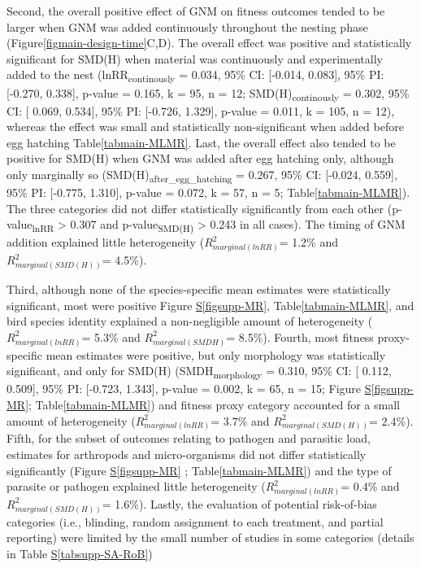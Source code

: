 \documentclass[
  number,
  review,
  onecolumn]{elsarticle}
\newcommand*\quartofigsuppref[1]{Figure \hyperref[#1]{S\ref{#1}}}
\newcommand*\quartotabsuppref[1]{Table \hyperref[#1]{S\ref{#1}}}
\begin{document}
Second, the overall positive effect of GNM on fitness outcomes tended to
be larger when GNM was added continuously throughout the nesting phase
(Figure\ref{figmain-design-time}C,D). The overall effect was positive
and statistically significant for SMD(H) when material was continuously
and experimentally added to the nest (lnRR\textsubscript{continously} =
0.034, 95\% CI: {[}-0.014, 0.083{]}, 95\% PI: {[}-0.270, 0.338{]},
p-value = 0.165, k = 95, n = 12; SMD(H)\textsubscript{continously} =
0.302, 95\% CI: {[} 0.069, 0.534{]}, 95\% PI: {[}-0.726, 1.329{]},
p-value = 0.011, k = 105, n = 12), whereas the effect was small and
statistically non-significant when added before egg hatching
Table\ref{tabmain-MLMR}. Last, the overall effect also tended to be
positive for SMD(H) when GNM was added after egg hatching only, although
only marginally so (SMD(H)\textsubscript{after\_egg\_hatching} = 0.267,
95\% CI: {[}-0.024, 0.559{]}, 95\% PI: {[}-0.775, 1.310{]}, p-value =
0.072, k = 57, n = 5; Table\ref{tabmain-MLMR}). The three categories did
not differ statistically significantly from each other
(p-value\textsubscript{lnRR} \textgreater{} 0.307 and
p-value\textsubscript{SMD(H)} \textgreater{} 0.243 in all cases). The
timing of GNM addition explained little heterogeneity
(\(R^2_{marginal(lnRR)}\)= 1.2\% and \(R^2_{marginal(SMD(H))}\)= 4.5\%).

Third, although none of the species-specific mean estimates were
statistically significant, most were positive
\quartofigsuppref{figsupp-MR}, Table\ref{tabmain-MLMR}, and bird species
identity explained a non-negligible amount of heterogeneity
(\(R^2_{marginal(lnRR)}\)= 5.3\% and \(R^2_{marginal(SMDH)}\)= 8.5\%).
Fourth, most fitness proxy-specific mean estimates were positive, but
only morphology was statistically significant, and only for SMD(H)
(SMDH\textsubscript{morphology} = 0.310, 95\% CI: {[} 0.112, 0.509{]},
95\% PI: {[}-0.723, 1.343{]}, p-value = 0.002, k = 65, n = 15;
\quartofigsuppref{figsupp-MR}; Table\ref{tabmain-MLMR}) and fitness
proxy category accounted for a small amount of heterogeneity
(\(R^2_{marginal(lnRR)}\)= 3.7\% and \(R^2_{marginal(SMD(H))}\)= 2.4\%).
Fifth, for the subset of outcomes relating to pathogen and parasitic
load, estimates for arthropods and micro-organisms did not differ
statistically significantly (\quartofigsuppref{figsupp-MR} ;
Table\ref{tabmain-MLMR}) and the type of parasite or pathogen explained
little heterogeneity (\(R^2_{marginal(lnRR)}\)= 0.4\% and
\(R^2_{marginal(SMD(H))}\)= 1.6\%). Lastly, the evaluation of potential
risk-of-bias categories (i.e., blinding, random assignment to each
treatment, and partial reporting) were limited by the small number of
studies in some categories (details in
\quartotabsuppref{tabsupp-SA-RoB})
\end{document}
